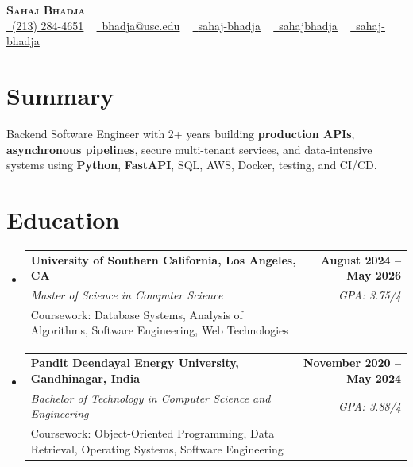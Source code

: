 \documentclass[letterpaper,10pt]{article}
\makeatletter
\newcommand{\sectionGap}{\vspace{-8pt}}
\newcommand{\resumeEduSubheading}[5]{\vspace{-1pt}\item\begin{tabular*}{1.0\textwidth}[t]{l@{\extracolsep{\fill}}r}\textbf{#1} & \textbf{\small #2} \\\textit{\small #3} & \textit{\small #4} \\\small #5 & \\\end{tabular*}\vspace{-4pt}}
\newcommand{\resumeSubHeadingListStart}{\begin{itemize}[leftmargin=0.0in, label={}]}
\newcommand{\resumeSubHeadingListEnd}{\end{itemize}}
\makeatother
\begin{document}
\begin{center}
{\Huge \scshape \textbf{Sahaj Bhadja}} \\ \vspace{1pt}
\small \href{tel:2132844651}{\faPhone\ \underline{(213) 284-4651}} ~ \href{mailto:bhadja@usc.edu}{\raisebox{-0.2\height}\faEnvelope\ \underline{bhadja@usc.edu}} ~
\href{https://www.linkedin.com/in/sahaj-bhadja/}{\raisebox{-0.2\height}\faLinkedin\ \underline{sahaj-bhadja}} ~ \href{https://github.com/SAHAJ-BHADJA}{\raisebox{-0.2\height}\faGithub\ \underline{sahajbhadja}} ~
\href{https://sahaj-bhadja.vercel.app/}{\raisebox{-0.2\height}\faGlobe\ \underline{sahaj-bhadja}}
\end{center}
\vspace{-16pt}
\section{Summary}
\begin{itemize}[leftmargin=0.15in, label={}]
\small{\item{Backend Software Engineer with 2+ years building \textbf{production APIs}, \textbf{asynchronous pipelines}, secure multi-tenant services, and data-intensive systems using \textbf{Python}, \textbf{FastAPI}, SQL, AWS, Docker, testing, and CI/CD.}}
\end{itemize}
\sectionGap
\section{Education}
\resumeSubHeadingListStart
\resumeEduSubheading{University of Southern California, Los Angeles, CA}{August 2024 -- May 2026}{Master of Science in Computer Science}{GPA: 3.75/4}{Coursework: Database Systems, Analysis of Algorithms, Software Engineering, Web Technologies}
\resumeEduSubheading{Pandit Deendayal Energy University, Gandhinagar, India}{November 2020 -- May 2024}{Bachelor of Technology in Computer Science and Engineering}{GPA: 3.88/4}{Coursework: Object-Oriented Programming, Data Retrieval, Operating Systems, Software Engineering}
\resumeSubHeadingListEnd
\sectionGap
\end{document}
